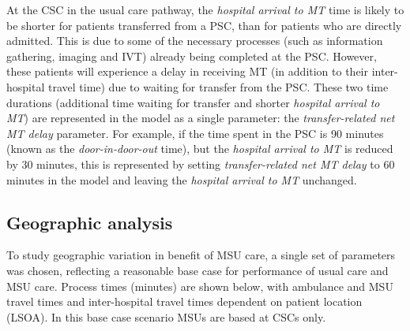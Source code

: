 At the CSC in the usual care pathway, the \emph{hospital arrival to MT} time is likely to be shorter for patients transferred from a PSC, than for patients who are directly admitted. This is due to some of the necessary processes (such as information gathering, imaging and IVT) already being completed at the PSC. However, these patients will experience a delay in receiving MT (in addition to their inter-hospital travel time) due to waiting for transfer from the PSC. These two time durations (additional time waiting for transfer and shorter \emph{hospital arrival to MT}) are represented in the model as a single parameter: the \emph{transfer-related net MT delay} parameter. For example, if the time spent in the PSC is 90 minutes (known as the \textit{door-in-door-out} time), but the \textit{hospital arrival to MT} is reduced by 30 minutes, this is represented by setting \textit{transfer-related net MT delay} to 60 minutes in the model and leaving the \emph{hospital arrival to MT} unchanged.

\subsection{Geographic analysis}

To study geographic variation in benefit of MSU care, a single set of parameters was chosen, reflecting a reasonable base case for performance of usual care and MSU care. Process times (minutes) are shown below, with ambulance and MSU travel times and inter-hospital travel times dependent on patient location (LSOA). In this base case scenario MSUs are based at CSCs only. 

